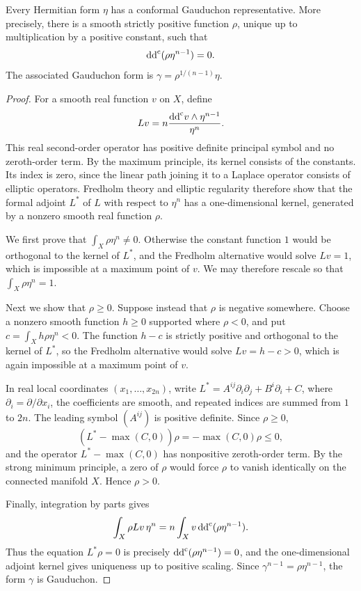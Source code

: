 \begin{theorem}\label{thm:gauduchon}
Every Hermitian form $\eta$ has a conformal Gauduchon representative. More precisely, there is a smooth strictly positive function $\rho$, unique up to multiplication by a positive constant, such that
\[
 \mathrm{dd}^{\mathrm{c}}(\rho\eta^{n-1})=0.
\]
The associated Gauduchon form is $\gamma=\rho^{1/(n-1)}\eta$.
\end{theorem}
\begin{proof}
For a smooth real function $v$ on $X$, define
\[
 Lv=n\frac{\mathrm{dd}^{\mathrm{c}} v\wedge\eta^{n-1}}{\eta^n}.
\]
This real second-order operator has positive definite principal symbol and no zeroth-order term. By the maximum principle, its kernel consists of the constants. Its index is zero, since the linear path joining it to a Laplace operator consists of elliptic operators. Fredholm theory and elliptic regularity therefore show that the formal adjoint $L^*$ of $L$ with respect to $\eta^n$ has a one-dimensional kernel, generated by a nonzero smooth real function $\rho$.

We first prove that $\int_X\rho\eta^n\ne0$. Otherwise the constant function $1$ would be orthogonal to the kernel of $L^*$, and the Fredholm alternative would solve $Lv=1$, which is impossible at a maximum point of $v$. We may therefore rescale so that $\int_X\rho\eta^n=1$.

Next we show that $\rho\geq0$. Suppose instead that $\rho$ is negative somewhere. Choose a nonzero smooth function $h\geq0$ supported where $\rho<0$, and put $c=\int_Xh\rho\eta^n<0$. The function $h-c$ is strictly positive and orthogonal to the kernel of $L^*$, so the Fredholm alternative would solve $Lv=h-c>0$, which is again impossible at a maximum point of $v$.

In real local coordinates $(x_1,\ldots,x_{2n})$, write $L^*=A^{ij}\partial_i\partial_j+B^i\partial_i+C$, where $\partial_i=\partial/\partial x_i$, the coefficients are smooth, and repeated indices are summed from $1$ to $2n$. The leading symbol $(A^{ij})$ is positive definite. Since $\rho\geq0$,
\[
 (L^*-\max(C,0))\rho=-\max(C,0)\rho\leq0,
\]
and the operator $L^*-\max(C,0)$ has nonpositive zeroth-order term. By the strong minimum principle, a zero of $\rho$ would force $\rho$ to vanish identically on the connected manifold $X$. Hence $\rho>0$.

Finally, integration by parts gives
\[
 \int_X\rho Lv\,\eta^n
 =n\int_Xv\,\mathrm{dd}^{\mathrm{c}}(\rho\eta^{n-1}).
\]
Thus the equation $L^*\rho=0$ is precisely $\mathrm{dd}^{\mathrm{c}}(\rho\eta^{n-1})=0$, and the one-dimensional adjoint kernel gives uniqueness up to positive scaling. Since $\gamma^{n-1}=\rho\eta^{n-1}$, the form $\gamma$ is Gauduchon.
\end{proof}

